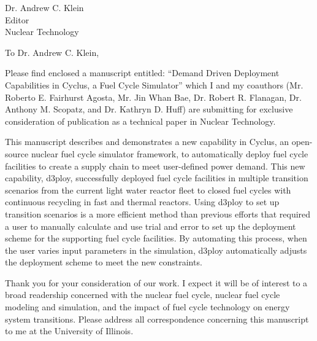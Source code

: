 \documentclass[11pt]{letter} %
\newcommand{\RecipientName}{Dr. Andrew C. Klein\xspace}
\newcommand{\RecipientAddress}{Editor\\Nuclear Technology}
\begin{document}
\small
\begin{letter}{\RecipientName\\
        \RecipientAddress\xspace}

\address{Gwendolyn J. Chee\\
gchee2@illinois.edu\\
226 Talbot Laboratory\\
104 Wright Street, MC-234\\
Urbana, IL 61801}


\opening{To \RecipientName,}

Please find enclosed a manuscript entitled: ``Demand Driven Deployment Capabilities in Cyclus, 
a Fuel Cycle Simulator'' which I and my 
coauthors (Mr. Roberto E. Fairhurst Agosta, Mr. Jin Whan Bae, 
Dr. Robert R. Flanagan, Dr. Anthony M. Scopatz, and Dr. Kathryn D. Huff) are submitting for 
exclusive consideration of publication as a technical paper in Nuclear Technology. 

This manuscript describes and demonstrates a new capability in Cyclus, an open-source nuclear 
fuel cycle simulator framework, 
to automatically deploy fuel cycle facilities to create a supply 
chain to meet user-defined power demand.
This new capability, d3ploy, successfully deployed fuel cycle facilities in
multiple transition scenarios from the current light water reactor 
fleet to closed fuel cycles with continuous recycling in fast and thermal reactors.
Using d3ploy to set up transition scenarios is a more
efficient method than previous efforts that required a user to manually calculate
and use trial and error to set up the deployment scheme for the supporting
fuel cycle facilities. By automating this process, when the user varies input
parameters in the simulation, d3ploy automatically adjusts the deployment
scheme to meet the new constraints.

Thank you for your consideration of our work.  I expect it will be of interest
to a broad readership concerned with the nuclear fuel cycle, 
nuclear fuel cycle modeling and simulation, and the impact of fuel cycle 
technology on energy system transitions. 
Please address all correspondence concerning this manuscript to me at the University of Illinois.




\end{letter}
\end{document}
